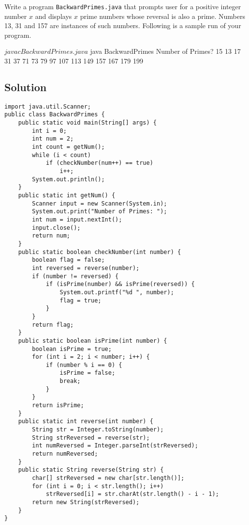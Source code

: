 \documentclass[12pt,letterpaper,twoside]{article}
\begin{document}
Write a program \texttt{BackwardPrimes.java} that prompts user for a positive integer number $x$ and displays $x$ prime numbers whose reversal is also a prime.
Numbers 13, 31 and 157 are instances of such numbers.
Following is a sample run of your program.

\begin{terminal}
$ javac BackwardPrimes.java
$ java BackwardPrimes
Number of Primes? 15
13 17 31 37 71 73 79 97 107 113 149 157 167 179 199
\end{terminal}

\subsection*{Solution}

\lstset{language=Java,tabsize=4}
\begin{lstlisting}
import java.util.Scanner;
public class BackwardPrimes {
	public static void main(String[] args) {
		int i = 0;
		int num = 2;
		int count = getNum();
		while (i < count)
			if (checkNumber(num++) == true)
				i++;
		System.out.println();
	}
	public static int getNum() {
		Scanner input = new Scanner(System.in);
		System.out.print("Number of Primes: ");
		int num = input.nextInt();
		input.close();
		return num;
	}
	public static boolean checkNumber(int number) {
		boolean flag = false;
		int reversed = reverse(number);
		if (number != reversed) {
			if (isPrime(number) && isPrime(reversed)) {
				System.out.printf("%d ", number);
				flag = true;
			}
		}
		return flag;
	}
	public static boolean isPrime(int number) {
		boolean isPrime = true;
		for (int i = 2; i < number; i++) {
			if (number % i == 0) {
				isPrime = false;
				break;
			}
		}
		return isPrime;
	}
	public static int reverse(int number) {
		String str = Integer.toString(number);
		String strReversed = reverse(str);
		int numReversed = Integer.parseInt(strReversed);
		return numReversed;
	}
	public static String reverse(String str) {
		char[] strReversed = new char[str.length()];
		for (int i = 0; i < str.length(); i++)
			strReversed[i] = str.charAt(str.length() - i - 1);
		return new String(strReversed);
	}
}
\end{lstlisting}
\end{document}

